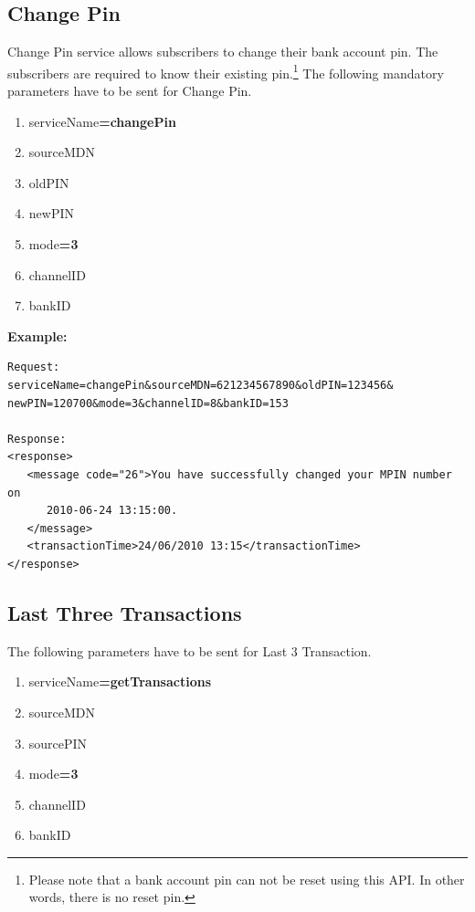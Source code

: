 \documentclass[11pt,titlepage]{article}
\begin{document}
\subsection{Change Pin}
Change Pin service allows subscribers to change their bank account pin. The subscribers are required to know their existing pin.\footnote{Please note that a bank account pin can not be reset using this API. In other words, there is no reset pin.} The following mandatory parameters have to be sent for Change Pin.
\begin{enumerate}
\item serviceName\textbf{=changePin}
\item sourceMDN
\item oldPIN
\item newPIN
\item mode\textbf{=3}
\item channelID
\item bankID
\end{enumerate}
\textbf{Example:}
\begin{verbatim}
Request:
serviceName=changePin&sourceMDN=621234567890&oldPIN=123456&
newPIN=120700&mode=3&channelID=8&bankID=153

Response:
<response>
   <message code="26">You have successfully changed your MPIN number on 
      2010-06-24 13:15:00.
   </message>
   <transactionTime>24/06/2010 13:15</transactionTime>
</response>
\end{verbatim}

\subsection{Last Three Transactions}
The following parameters have to be sent for Last 3 Transaction.
\begin{enumerate}
\item serviceName\textbf{=getTransactions}
\item sourceMDN
\item sourcePIN
\item mode\textbf{=3}
\item channelID
\item bankID
\end{enumerate}
\end{document}
